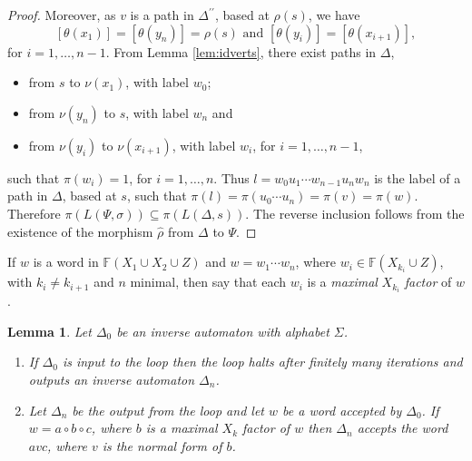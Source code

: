 \documentclass[a4paper,12pt]{article}
\renewcommand{\a}{\alpha }
\renewcommand{\b}{\beta }
\newcommand{\g}{\gamma }
\newcommand{\D}{\Delta }
\newcommand{\T}{\Theta }
\renewcommand{\L}{\Lambda }
\newcommand{\s}{\sigma }
\renewcommand{\S}{\Sigma }
\newtheorem{lemma}[theorem]{Lemma}
\numberwithin{equation}{section}
\numberwithin{figure}{section}
\newcommand{\FF}{\ensuremath{\mathbb{F}}}
\newcommand{\be}{\begin{enumerate}}
\newcommand{\ee}{\end{enumerate}}
\begin{document}
\begin{proof}
 Moreover, as $v$ is a path in $\D^{\prime\prime}$, based at $\rho(s)$,
we have
\[[\theta(x_1)]=[\theta(y_n)]=\rho(s)\textrm{ and }[\theta(y_i)]=[\theta(x_{i+1})],\]
for $i=1,\ldots ,n-1$. From Lemma \ref{lem:idverts}, there exist paths in
$\D$,
\begin{itemize}
\item
from $s$ to $\nu(x_1)$, with label $w_0$;
\item  from $\nu(y_n)$ to $s$, with label $w_n$ and
\item from $\nu(y_i)$ to $\nu(x_{i+1})$, with label $w_i$, for $i=1,\ldots,
n-1$,
\end{itemize}
such that $\pi(w_i)=1$, for $i=1,\ldots ,n$. Thus $l=w_0u_1\cdots w_{n-1}u_n
w_n$ is the label of a path in $\D$, based at $s$, such that
$\pi(l)=\pi(u_0\cdots u_n)=\pi(v)=\pi(w)$.
 Therefore
$\pi(L(\Psi,\s))\subseteq \pi(L(\D,s))$. The reverse inclusion follows
from the existence of the morphism $\hat\rho$ from $\D$ to $\Psi$.

\end{proof}
If $w$ is a word in $\FF(X_1\cup X_2\cup Z)$ and $w=w_1\cdots w_n$,
where $w_i\in \FF(X_{k_i}\cup Z)$, with $k_i\neq k_{i+1}$ and $n$
minimal, then  say that each $w_i$ is a \emph {maximal} $X_{k_i}$
\emph{factor}
of $w$.
\begin{lemma}\label{lem:loopstop}
Let $\D_0$ be an inverse automaton with alphabet $\S$.
\be
\item\label{it:loopstop1}
If $\D_0$ is input  to  the loop then the loop halts after
finitely many iterations and outputs an inverse automaton  $\D_n$.
\item\label{it:loopstop2} Let $\D_n$ be the output from the loop and let $w$ be a word
accepted by $\D_0$. If $w=a\circ b \circ c$,
where $b$ is a maximal $X_k$ factor of $w$ then $\D_n$ accepts
the word $avc$, where $v$ is the normal form of $b$.
\ee
\end{lemma}
\end{document}
